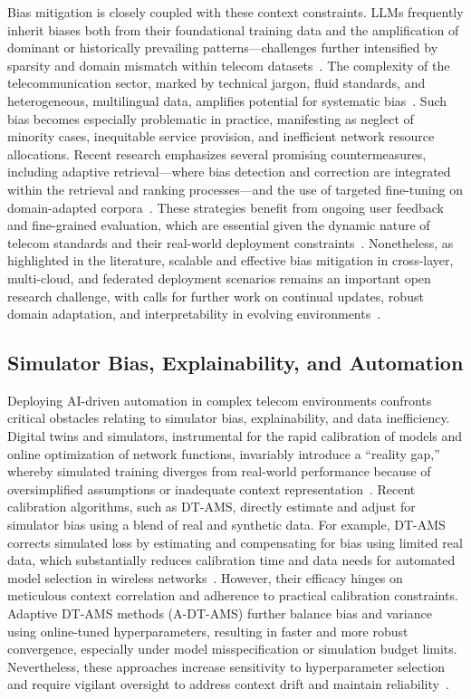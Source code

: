 \documentclass[sigconf]{acmart}
\begin{document}
Bias mitigation is closely coupled with these context constraints. LLMs frequently inherit biases both from their foundational training data and the amplification of dominant or historically prevailing patterns—challenges further intensified by sparsity and domain mismatch within telecom datasets~\cite{ref7,ref9,ref21}. The complexity of the telecommunication sector, marked by technical jargon, fluid standards, and heterogeneous, multilingual data, amplifies potential for systematic bias~\cite{ref7,ref22,ref26}. Such bias becomes especially problematic in practice, manifesting as neglect of minority cases, inequitable service provision, and inefficient network resource allocations. Recent research emphasizes several promising countermeasures, including adaptive retrieval—where bias detection and correction are integrated within the retrieval and ranking processes—and the use of targeted fine-tuning on domain-adapted corpora~\cite{ref20,ref21,ref22,ref28}. These strategies benefit from ongoing user feedback and fine-grained evaluation, which are essential given the dynamic nature of telecom standards and their real-world deployment constraints~\cite{ref20,ref22}. Nonetheless, as highlighted in the literature, scalable and effective bias mitigation in cross-layer, multi-cloud, and federated deployment scenarios remains an important open research challenge, with calls for further work on continual updates, robust domain adaptation, and interpretability in evolving environments~\cite{ref16,ref26,ref37}.

\subsection{Simulator Bias, Explainability, and Automation}

Deploying AI-driven automation in complex telecom environments confronts critical obstacles relating to simulator bias, explainability, and data inefficiency. Digital twins and simulators, instrumental for the rapid calibration of models and online optimization of network functions, invariably introduce a ``reality gap,'' whereby simulated training diverges from real-world performance because of oversimplified assumptions or inadequate context representation~\cite{ref37,ref41}. Recent calibration algorithms, such as DT-AMS, directly estimate and adjust for simulator bias using a blend of real and synthetic data. For example, DT-AMS corrects simulated loss by estimating and compensating for bias using limited real data, which substantially reduces calibration time and data needs for automated model selection in wireless networks~\cite{ref37}. However, their efficacy hinges on meticulous context correlation and adherence to practical calibration constraints. Adaptive DT-AMS methods (A-DT-AMS) further balance bias and variance using online-tuned hyperparameters, resulting in faster and more robust convergence, especially under model misspecification or simulation budget limits. Nevertheless, these approaches increase sensitivity to hyperparameter selection and require vigilant oversight to address context drift and maintain reliability~\cite{ref37,ref41}.
\end{document}
